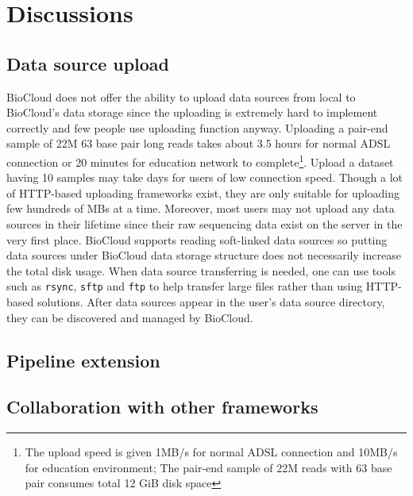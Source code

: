 \chapter{Discussions}
\label{c:discussion}


\section{Data source upload}

BioCloud does not offer the ability to upload data sources from local to
BioCloud's data storage since the uploading is extremely hard to implement
correctly and few people use uploading function anyway. Uploading a pair-end
sample of 22M 63 base pair long reads takes about 3.5 hours for normal ADSL
connection or 20 minutes for education network to complete\footnote{The upload
speed is given 1MB/s for normal ADSL connection and 10MB/s for education
environment; The pair-end sample of 22M reads with 63 base pair consumes total
12 GiB disk space}. Upload a dataset having 10 samples may take days for users
of low connection speed. Though a lot of HTTP-based uploading frameworks exist,
they are only suitable for uploading few hundreds of MBs at a time. Moreover,
most users may not upload any data sources in their lifetime since their raw
sequencing data exist on the server in the very first place. BioCloud supports
reading soft-linked data sources so putting data sources under BioCloud data
storage structure does not necessarily increase the total disk usage. When data
source transferring is needed, one can use tools such as \texttt{rsync},
\texttt{sftp} and \texttt{ftp} to help transfer large files rather than using
HTTP-based solutions. After data sources appear in the user's data source
directory, they can be discovered and managed by BioCloud.



\section{Pipeline extension}
\label{s:pipeline-extension}

%
%


\section{Collaboration with other frameworks}

